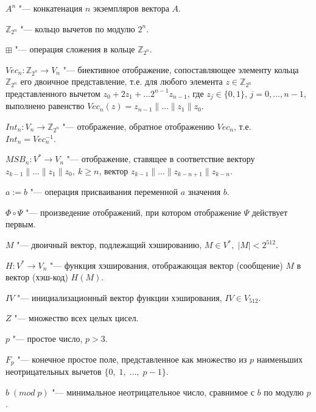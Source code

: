 \par
$A^n$ "--- конкатенация $n$  экземпляров вектора $A$.
\par
$\mathbb{Z}_{2^n}$ "--- кольцо вычетов по модулю $2^n$.
\par
$\boxplus$ "--- операция сложения в кольце $\mathbb{Z}_{2^n}$.
\par
$Vec_n:\mathbb{Z}_{2^n} \to V_n$ "--- биективное отображение, сопоставляющее элементу кольца $\mathbb{Z}_{2^n}$ его двоичное представление, т.е. для любого элемента $z \in \mathbb{Z}_{2^n}$ представленного вычетом $z_0+2z_1 + \dots 2^{n-1}z_{n-1}$, где $z_j \in \{0,1\},\,j=0,\dots,n-1$, выполнено равенство $Vec_n(z)=z_{n-1}\|\dots\|z_1\|z_0$.
\par
$Int_n\colon V_n \to \mathbb{Z}_{2^n}$ "--- отображение, обратное отображению $Vec_n$, т.е. \\ $Int_n = Vec_n^{-1}$.
\par
$MSB_n\colon V^* \to V_n$ "--- отображение, ставящее в соответствие вектору \\ $z_{k-1}\|\dots\|z_1\|z_0,\:k\geqslant n$, вектор $z_{k-1}\|\dots\|z_{k-n+1}\|z_{k-n}$.
\par
$a:=b$ "--- операция присваивания переменной $a$ значения $b$.
\par
$\Phi\circ\Psi$ "--- произведение отображений, при котором отображение $\Psi$ действует первым.
\par
$M$ "--- двоичный вектор, подлежащий хэшированию, $M \in V^*,\; |M|<2^{512}$.
\par
$H \colon V^* \to V_n$ "--- функция хэширования, отображающая вектор (сообщение) $M$ в вектор (хэш-код) $H(M)$.
\par
$IV$ "--- инициализационный вектор функции хэширования, $IV \in V_{512}$.
\par
$Z$ "--- множество всех целых цисел.
\par
$p$ "--- простое число, $p>3$.
\par
$F_p$ "--- конечное простое поле, представленное как множество  из $p$ наименьших неотрицательных вычетов $\{0,\;1,\;\dots,\;p-1\}$.
\par
$b\;(mod\; p)$ "--- минимальное неотрицательное число, сравнимое с $b$ по модулю $p$.

